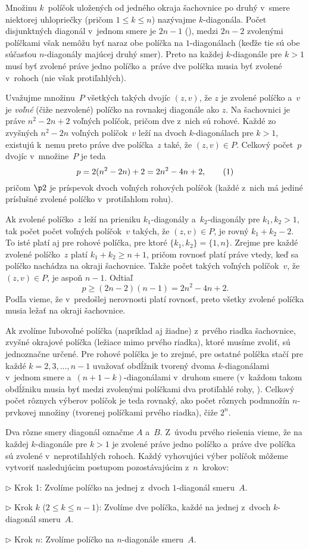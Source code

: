 {%
Množinu $k$~políčok uložených od jedného okraja šachovnice po druhý v~smere niektorej uhlopriečky (pričom $1\le k\le n$) nazývajme $k$-diagonála. Počet disjunktných diagonál v~jednom smere je $2n-1$ (\obr), medzi $2n-2$ zvolenými políčkami však nemôžu byť naraz obe políčka na $1$-diagonálach (keďže tie sú obe súčasťou $n$-diagonály majúcej druhý smer). Preto na každej $k$-diagonále pre $k>1$ musí byť zvolené práve jedno políčko a~práve dve políčka musia byť zvolené v~rohoch (nie však protiľahlých).
%

Uvažujme množinu~$P$ všetkých takých dvojíc $(z,v)$, že $z$ je zvolené políčko a~$v$ je {\it voľné\/} (čiže nezvolené) políčko na rovnakej diagonále ako $z$. Na šachovnici je práve $n^2-2n+2$ voľných políčok, pričom dve z~nich sú rohové. Každé zo zvyšných $n^2-2n$ voľných políčok~$v$ leží na dvoch $k$-diagonálach pre $k>1$, existujú k~nemu preto práve dve políčka~$z$ také, že $(z,v)\in P$. Celkový počet~$p$ dvojíc v~množine~$P$ je teda
$$
p=2(n^2-2n)+2=2n^2-4n+2,\tag1
$$
pričom $\p2$ je príspevok dvoch voľných rohových políčok (každé z~nich má jediné príslušné zvolené políčko v~protiľahlom rohu).

Ak zvolené políčko~$z$ leží na prieniku $k_1$-diagonály a~$k_2$-diagonály pre $k_1,k_2>1$, tak počet počet voľných políčok~$v$ takých, že $(z,v)\in P$, je rovný $k_1+k_2-2$. To isté platí aj pre rohové políčka, pre ktoré $\{k_1,k_2\}=\{1,n\}$. Zrejme pre každé zvolené políčko~$z$ platí $k_1+k_2\ge n+1$, pričom rovnosť platí práve vtedy, keď sa políčko nachádza na okraji šachovnice. Takže počet takých voľných políčok~$v$, že $(z,v)\in P$, je aspoň $n-1$. Odtiaľ
$$
p\ge(2n-2)(n-1)=2n^2-4n+2.
$$
Podľa  vieme, že v~predošlej nerovnosti platí rovnosť, preto všetky zvolené políčka musia ležať na okraji šachovnice.

Ak zvolíme ľubovoľné políčka (napríklad aj žiadne) z~prvého riadka šachovnice, zvyšné okrajové políčka (ležiace mimo prvého riadka), ktoré musíme zvoliť, sú jednoznačne určené. Pre rohové políčka je to zrejmé, pre ostatné políčka stačí pre každé $k=2,3,\dots,n-1$ uvažovať obdĺžnik tvorený dvoma $k$-diagonálami v~jednom smere a~$(n+1-k)$-diagonálami v~druhom smere (v~každom takom obdĺžniku musia byť medzi zvolenými políčkami dva protiľahlé rohy, \obr). Celkový počet rôznych výberov políčok je teda rovnaký, ako počet rôznych podmnožín $n$-prvkovej množiny (tvorenej políčkami prvého riadka), čiže $2^n$.
%

\ineriesenie
{}
Dva rôzne smery diagonál označme $A$ a~$B$. Z~úvodu prvého riešenia vieme, že na každej $k$-diagonále pre $k>1$ je zvolené práve jedno políčko a~práve dve políčka sú zvolené v~neprotiľahlých rohoch. Každý vyhovujúci výber políčok môžeme vytvoriť nasledujúcim postupom pozostávajúcim z~$n$~krokov:
\item{$\triangleright$}
Krok 1: Zvolíme políčko na jednej z~dvoch $1$-diagonál smeru~$A$.
\item{$\triangleright$}
Krok $k$ ($2\le k\le n-1$): Zvolíme dve políčka, každé na jednej z~dvoch $k$-diagonál smeru~$A$.
\item{$\triangleright$}
Krok $n$: Zvolíme políčko na $n$-diagonále smeru~$A$.

}

